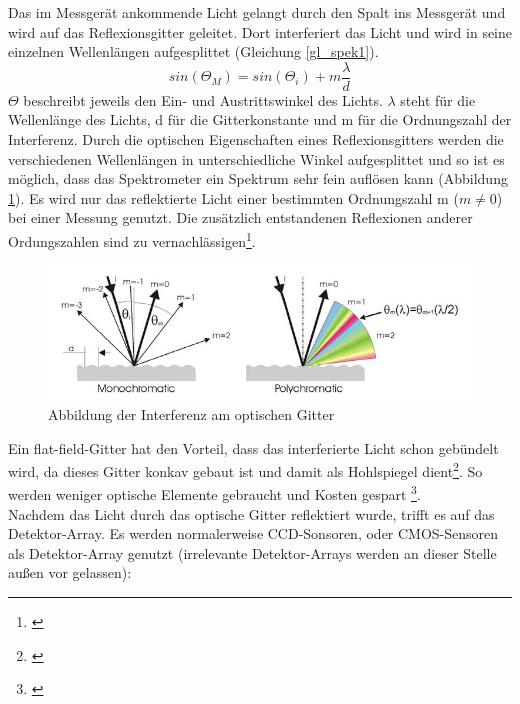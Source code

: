\noindent Das im Messgerät ankommende Licht gelangt durch den Spalt  ins Messgerät und wird auf das Reflexionsgitter geleitet. Dort interferiert das Licht und wird in seine einzelnen Wellenlängen aufgesplittet (Gleichung \ref{gl_spek1}).
\begin{equation}\label{gl_spek1}
		sin(\Theta_{M})=sin(\Theta_{i})+m \frac{\lambda}{d}
\end{equation}
$\Theta$ beschreibt jeweils den Ein- und Austrittswinkel des Lichts. $\lambda$ steht für die Wellenlänge des Lichts, d für die Gitterkonstante und m für die Ordnungszahl der Interferenz. Durch die optischen Eigenschaften eines Reflexionsgitters werden die verschiedenen Wellenlängen in unterschiedliche Winkel aufgesplittet und so ist es möglich, dass das Spektrometer ein Spektrum sehr fein auflösen kann (Abbildung \ref{b_spek1}). Es wird nur das reflektierte Licht einer bestimmten Ordnungszahl m ($m \neq 0$) bei einer Messung genutzt. Die zusätzlich entstandenen Reflexionen anderer Ordungszahlen sind zu vernachlässigen\footnote{\cite[6]{jeti}}. 

\begin{figure}[htp]     %
\centering
\includegraphics[width=1.0\textwidth]{bilder/spek1} 
\caption {Abbildung der Interferenz am optischen Gitter\protect\footnotemark}\label{b_spek1}
\end{figure}

\noindent Ein flat-field-Gitter hat den Vorteil, dass das interferierte Licht schon gebündelt wird, da dieses Gitter konkav gebaut ist und damit als Hohlspiegel dient\footnote{\cite{wiki}}. So werden weniger optische Elemente gebraucht und Kosten gespart \footnote{\cite[7]{jeti}}.\\
Nachdem das Licht durch das optische Gitter reflektiert wurde, trifft es auf das Detektor-Array. Es werden normalerweise CCD-Sonsoren, oder CMOS-Sensoren als Detektor-Array genutzt (irrelevante Detektor-Arrays werden an dieser Stelle außen vor gelassen):


